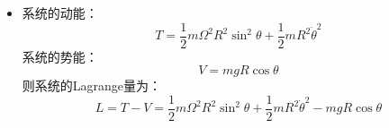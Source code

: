 \documentclass[a4paper,fontset=windows]{ctexart}
\begin{document}
\begin{itemize}
        代入$\delta S$得：
        \begin{align*}
        \delta S
        &= mc\int\frac{\mathrm{d}^2 x_\mu}{\mathrm{d}s^2}\delta x^\mu\mathrm{d}s - \frac{e}{c}\int\delta A_\nu\mathrm{d}x^\nu + \frac{e}{c}\int \delta x^\mu\mathrm{d}A_\mu \\
        &= mc\int\frac{\mathrm{d}^2 x_\mu}{\mathrm{d}s^2}\delta x^\mu\mathrm{d}s - \frac{e}{c}\int(\partial_\mu A_\nu\delta x^\mu)\mathrm{d}x^\nu + \frac{e}{c}\int \delta x^\mu(\partial_\nu A_\mu\mathrm{d}x^\nu) \\
        &= mc\int\frac{\mathrm{d}^2 x_\mu}{\mathrm{d}s^2}\delta x^\mu\mathrm{d}s - \frac{e}{c}\int\partial_\mu A_\nu\frac{\mathrm{d}x^\nu}{\mathrm{d}s}\delta x^\mu\mathrm{d}s + \frac{e}{c}\int\partial_\nu A_\mu\frac{\mathrm{d}x^\nu}{\mathrm{d}s}\delta x^\mu\mathrm{d}s \\
        &= mc\int\frac{\mathrm{d}^2 x_\mu}{\mathrm{d}s^2}\delta x^\mu\mathrm{d}s - \frac{e}{c}\int(\partial_\mu A_\nu - \partial_\nu A_\mu)\frac{\mathrm{d}x^\nu}{\mathrm{d}s}\delta x^\mu\mathrm{d}s \\
        &= 0
        \end{align*}
        由于$\delta x^\mu$是任意的变分，得到粒子的运动方程：
        \[
        mc\frac{\mathrm{d}^2 x_\mu}{\mathrm{d}s^2} = \frac{e}{c}(\partial_\mu A_\nu - \partial_\nu A_\mu)\frac{\mathrm{d}x^\nu}{\mathrm{d}s}
        \]
        记四维张量场强：
        \[
        F_{\mu\nu} = \partial_\mu A_\nu - \partial_\nu A_\mu
        \]
        则运动方程写为：
        \[
        mc\frac{\mathrm{d}^2 x_\mu}{\mathrm{d}s^2} = \frac{e}{c}F_{\mu\nu}\frac{\mathrm{d}x^\nu}{\mathrm{d}s}
        \]
        \bigskip

        \item[9.(a)]
        系统的动能：
        \[
        T = \frac{1}{2}m\varOmega^2 R^2\sin^2\theta + \frac{1}{2}mR^2\dot{\theta}^2
        \]
        系统的势能：
        \[
        V = mgR\cos\theta
        \]
        则系统的Lagrange量为：
        \[
        L = T - V = \frac{1}{2}m\varOmega^2 R^2\sin^2\theta + \frac{1}{2}mR^2\dot{\theta}^2 - mgR\cos\theta
        \]
        \medskip


\end{itemize}
\end{document}
